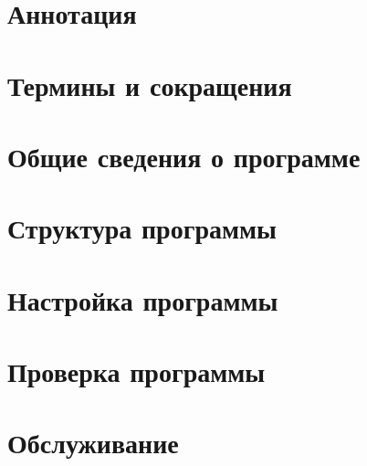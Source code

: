 \documentclass[a4paper,11pt]{report}
\begin{document}


\chapter*{Аннотация}
	

\tableofcontents
\clearpage

\chapter{Термины и сокращения}
	
\chapter{Общие сведения о программе}
	
\chapter{Структура программы}
	
\chapter{Настройка программы}
	
\chapter{Проверка программы}
	
\chapter{Обслуживание}
	
\end{document}
